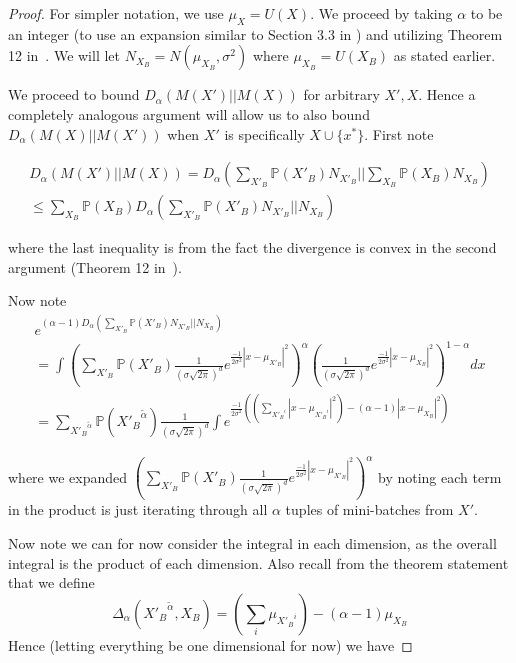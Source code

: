 \begin{proof}

For simpler notation, we use $\mu_X = U(X)$. We proceed by taking $\alpha$ to be an integer (to use an expansion similar to Section 3.3 in \citet{mironov2019r}) and utilizing Theorem 12 in~\citet{van2014renyi}. We will let $N_{X_B} = N(\mu_{X_B},\sigma^2)$ where $\mu_{X_B} = U(X_B)$ as stated earlier.


We proceed to bound $D_{\alpha}(M(X') || M(X))$ for arbitrary $X',X$. Hence a completely analogous argument will allow us to also bound $D_{\alpha}(M(X) || M(X'))$ when $X'$ is specifically $X \cup \{x^*\}$. First note


\begin{multline}
    D_{\alpha}(M(X') || M(X)) = D_{\alpha}(\sum_{X'_B} \mathbb{P}(X'_B) N_{X'_B} || \sum_{X_B} \mathbb{P}(X_B) N_{X_B}) \\ \leq \sum_{X_B} \mathbb{P}(X_B) D_{\alpha}(\sum_{X'_B} \mathbb{P}(X'_B) N_{X'_B} || N_{X_B})
\end{multline}


where the last inequality is from the fact the divergence is convex in the second argument (Theorem 12 in~\citet{van2014renyi}). 

Now note 
\begin{multline}
    e^{(\alpha-1)D_{\alpha}(\sum_{X'_B} \mathbb{P}(X'_B) N_{X'_B} || N_{X_B})} \\ = \int (\sum_{X'_B}\mathbb{P}(X'_B) \frac{1}{(\sigma \sqrt{2\pi})^d} e^{\frac{-1}{2\sigma^2} |x - \mu_{X'_B}|^2})^{\alpha} (\frac{1}{(\sigma \sqrt{2\pi})^d} e^{\frac{-1}{2\sigma^2}|x - \mu_{X_B}|^2})^{1- \alpha} dx \\ = \sum_{{X'_B}^{\tilde \alpha}} \mathbb{P}({X'_B}^{\tilde \alpha}) \frac{1}{(\sigma \sqrt{2\pi})^d} \int e^{\frac{-1}{2\sigma^2} ( (\sum_{{X'_B}^i}|x- \mu_{{X'_B}^i}|^2) - (\alpha - 1)|x - \mu_{X_B}|^2)}
\end{multline}


where we expanded $(\sum_{X'_B}\mathbb{P}(X'_B) \frac{1}{(\sigma \sqrt{2\pi})^d} e^{\frac{-1}{2\sigma^2} |x - \mu_{X'_B}|^2})^{\alpha}$ by noting each term in the product is just iterating through all $\alpha$ tuples of mini-batches from $X'$.

Now note we can for now consider the integral in each dimension, as the overall integral is the product of each dimension. Also recall from the theorem statement that we define $$\Delta_{\alpha}({X'_B}^{\tilde \alpha},X_B) = (\sum_{i} \mu_{{X'_B}^i}) - (\alpha - 1) \mu_{X_B}$$ Hence (letting everything be one dimensional for now) we have


\end{proof}
